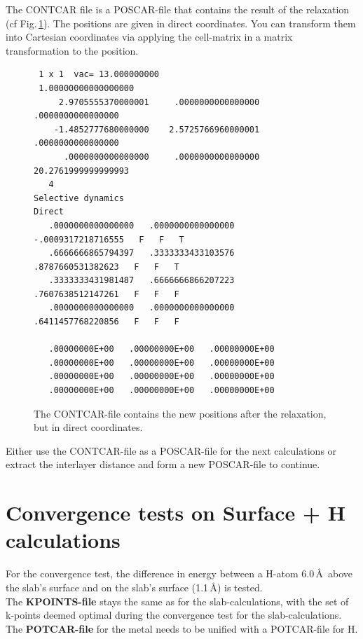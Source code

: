 \documentclass[11pt,oneside,a4paper, captions=nooneline, headsepline]{article}%
\begin{document}
The CONTCAR file is a POSCAR-file that contains the result of the relaxation (cf Fig.\,\ref{contcar}). The positions are given in direct coordinates. You can transform them into Cartesian coordinates via applying the cell-matrix in a matrix transformation to the position.
\begin{figure}[h!!]
\begin{verbatim}
 1 x 1  vac= 13.000000000
 1.00000000000000000
     2.9705555370000001     .0000000000000000     .0000000000000000
    -1.4852777680000000    2.5725766960000001     .0000000000000000
      .0000000000000000     .0000000000000000   20.2761999999999993
   4
Selective dynamics
Direct
   .0000000000000000   .0000000000000000  -.0009317218716555   F   F   T
   .6666666865794397   .3333333433103576   .8787660531382623   F   F   T
   .3333333431981487   .6666666866207223   .7607638512147261   F   F   F
   .0000000000000000   .0000000000000000   .6411457768220856   F   F   F

   .00000000E+00   .00000000E+00   .00000000E+00
   .00000000E+00   .00000000E+00   .00000000E+00
   .00000000E+00   .00000000E+00   .00000000E+00
   .00000000E+00   .00000000E+00   .00000000E+00

\end{verbatim}
\caption{The CONTCAR-file contains the new positions after the relaxation, but in direct coordinates.}
\label{contcar}
\end{figure}
Either use the CONTCAR-file as a POSCAR-file for the next calculations or extract the interlayer distance and form a new POSCAR-file to continue.

\section{Convergence tests on Surface + H calculations}
\label{H+slab}
For the convergence test, the difference in energy between a H-atom 6.0\,\AA~above the slab's surface and on the slab's surface (1.1\,\AA) is tested. \\
The \textbf{KPOINTS-file} stays the same as for the slab-calculations, with the set of k-points deemed optimal during the convergence test for the slab-calculations. 
The \textbf{POTCAR-file} for the metal needs to be unified with a POTCAR-file for H.
\end{document}

